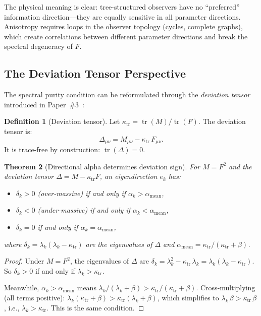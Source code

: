 \documentclass[11pt,a4paper]{article}
\theoremstyle{plain}
\newtheorem{theorem}{Theorem}[section]
\theoremstyle{definition}
\newtheorem{definition}[theorem]{Definition}
\DeclareMathOperator{\tr}{tr}
\begin{document}
The physical meaning is clear: tree-structured observers have no
``preferred'' information direction---they are equally sensitive
in all parameter directions.  Anisotropy requires loops in the
observer topology (cycles, complete graphs), which create
correlations between different parameter directions and break the
spectral degeneracy of $F$.


\subsection{The Deviation Tensor Perspective}

The spectral purity condition can be reformulated through the
\emph{deviation tensor} introduced in
Paper~\#3~\cite{companion_amari}:

\begin{definition}[Deviation tensor]
\label{def:deviation}
Let $\kappa_{\tr} = \tr(M)/\tr(F)$.  The deviation tensor is:
\begin{equation}
\label{eq:deviation}
\Delta_{\mu\nu} = M_{\mu\nu} - \kappa_{\tr}\,F_{\mu\nu}.
\end{equation}
It is trace-free by construction: $\tr(\Delta) = 0$.
\end{definition}

\begin{theorem}[Directional alpha determines deviation sign]
\label{thm:alpha_delta}
For $M = F^2$ and the deviation tensor
$\Delta = M - \kappa_{\tr} F$, an eigendirection $e_k$ has:
\begin{itemize}[noitemsep]
\item $\delta_k > 0$ (over-massive) if and only if
  $\alpha_k > \alpha_{\mathrm{mean}}$,
\item $\delta_k < 0$ (under-massive) if and only if
  $\alpha_k < \alpha_{\mathrm{mean}}$,
\item $\delta_k = 0$ if and only if
  $\alpha_k = \alpha_{\mathrm{mean}}$,
\end{itemize}
where $\delta_k = \lambda_k(\lambda_k - \kappa_{\tr})$ are the
eigenvalues of $\Delta$ and
$\alpha_{\mathrm{mean}} = \kappa_{\tr}/(\kappa_{\tr} + \beta)$.
\end{theorem}

\begin{proof}
Under $M = F^2$, the eigenvalues of $\Delta$ are
$\delta_k = \lambda_k^2 - \kappa_{\tr}\,\lambda_k =
\lambda_k(\lambda_k - \kappa_{\tr})$.
So $\delta_k > 0$ if and only if $\lambda_k > \kappa_{\tr}$.

Meanwhile, $\alpha_k > \alpha_{\mathrm{mean}}$ means
$\lambda_k/(\lambda_k + \beta) > \kappa_{\tr}/(\kappa_{\tr}+\beta)$.
Cross-multiplying (all terms positive):
$\lambda_k(\kappa_{\tr} + \beta) > \kappa_{\tr}(\lambda_k + \beta)$,
which simplifies to $\lambda_k\,\beta > \kappa_{\tr}\,\beta$,
i.e., $\lambda_k > \kappa_{\tr}$.  This is the same condition.
\end{proof}
\end{document}

